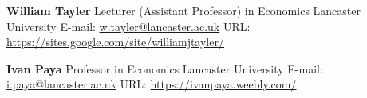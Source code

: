 \documentclass[10pt,]{article}
\begin{document}
              \textbf{William Tayler} \newline  Lecturer (Assistant Professor) in
              Economics \newline  Lancaster University \newline  E-mail:
              \url{w.tayler@lancaster.ac.uk} \newline  URL:
              \url{https://sites.google.com/site/williamjtayler/}
              
              \textbf{Ivan Paya} \newline  Professor in Economics \newline  Lancaster
              University \newline  E-mail: \url{i.paya@lancaster.ac.uk} \newline  URL:
              \url{https://ivanpaya.weebly.com/}
              
                
                                                                
\end{document}
